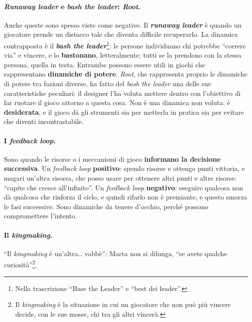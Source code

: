 \paragraph{\emph{Runaway leader} e \emph{bash the leader}: \emph{Root}.} Anche queste sono
spesso viste come negative. Il \textbf{\emph{runaway leader}} è quando un giocatore prende un
distacco tale che diventa difficile recuperarlo. La dinamica contrapposta è il \textbf{\emph{bash
the leader}}\footnote{Nella trascrizione ``Base the Leader'' e ``best dei leader''.}: le persone
individuano chi potrebbe ``correre via'' e vincere, e lo \textbf{bastonano}, letteralmente;
tutti se la prendono con la stessa persona, quella in testa. Entrambe possono essere utili in
giochi che rappresentano \textbf{dinamiche di potere}. \emph{Root}, che rappresenta proprio le
dinamiche di potere tra fazioni diverse, ha fatto del \emph{bash the leader} una delle sue
caratteristiche peculiari: il designer l'ha voluta mettere dentro con l'obiettivo di far
ruotare il gioco attorno a questa cosa. Non è una dinamica non voluta: è
\textbf{desiderata}, e il gioco dà gli strumenti sia per metterla in pratica sia per evitare che
diventi incontrastabile.

\paragraph{I \emph{feedback loop}.} Sono quando le risorse o i meccanismi di gioco
\textbf{informano la decisione successiva}. Un \emph{feedback loop} \textbf{positivo}: spendo
risorse e ottengo punti vittoria, e magari un'altra risorsa, che posso usare per ottenere altri
punti e altre risorse: ``capite che cresce all'infinito''. Un \emph{feedback loop}
\textbf{negativo}: eseguire qualcosa non dà qualcosa che rinforza il ciclo, e quindi rifarlo non
è premiante, e questo smorza le fasi successive. Sono dinamiche da tenere d'occhio, perché
possono compromettere l'intento.

\paragraph{Il \emph{kingmaking}.} ``Il \emph{kingmaking} è un'altra\ldots{} vabbè'': Marta non si
dilunga, ``se avete qualche curiosità''\footnote{Il \emph{kingmaking} è la situazione in cui
un giocatore che non può più vincere decide, con le sue mosse, chi tra gli altri vincerà.}.

